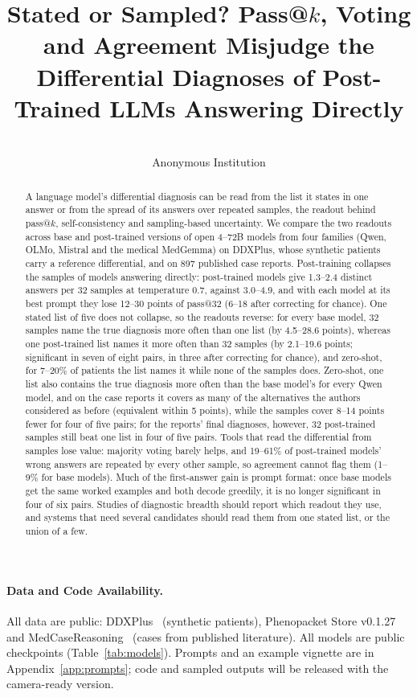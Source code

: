 \documentclass[wcp]{jmlr}
\title[Stated or Sampled?]{Stated or Sampled? Pass@$k$, Voting and Agreement Misjudge the Differential Diagnoses of Post-Trained LLMs Answering Directly}
\author{\Name{Anonymous Authors}\\ \addr Anonymous Institution}
\begin{document}
\maketitle

\begin{abstract}
A language model's differential diagnosis can be read from the list it states in one answer or from the spread of its answers over repeated samples, the readout behind pass@$k$, self-consistency and sampling-based uncertainty. We compare the two readouts across base and post-trained versions of open 4--72B models from four families (Qwen, OLMo, Mistral and the medical MedGemma) on DDXPlus, whose synthetic patients carry a reference differential, and on 897 published case reports.
Post-training collapses the samples of models answering directly: post-trained models give 1.3--2.4 distinct answers per 32 samples at temperature 0.7, against 3.0--4.9, and with each model at its best prompt they lose 12--30 points of pass@32 (6--18 after correcting for chance). One stated list of five does not collapse, so the readouts reverse: for every base model, 32 samples name the true diagnosis more often than one list (by 4.5--28.6 points), whereas one post-trained list names it more often than 32 samples (by 2.1--19.6 points; significant in seven of eight pairs, in three after correcting for chance), and zero-shot, for 7--20\% of patients the list names it while none of the samples does. Zero-shot, one list also contains the true diagnosis more often than the base model's for every Qwen model, and on the case reports it covers as many of the alternatives the authors considered as before (equivalent within 5 points), while the samples cover 8--14 points fewer for four of five pairs; for the reports' final diagnoses, however, 32 post-trained samples still beat one list in four of five pairs.
Tools that read the differential from samples lose value: majority voting barely helps, and 19--61\% of post-trained models' wrong answers are repeated by every other sample, so agreement cannot flag them (1--9\% for base models). Much of the first-answer gain is prompt format: once base models get the same worked examples and both decode greedily, it is no longer significant in four of six pairs. Studies of diagnostic breadth should report which readout they use, and systems that need several candidates should read them from one stated list, or the union of a few.
\end{abstract}

\paragraph{Data and Code Availability.}
All data are public: DDXPlus~\citep{fansi2022ddxplus} (synthetic patients), Phenopacket Store v0.1.27~\citep{danis2025phenopacketstore} and MedCaseReasoning~\citep{wu2025medcasereasoning} (cases from published literature). All models are public checkpoints (Table~\ref{tab:models}). Prompts and an example vignette are in Appendix~\ref{app:prompts}; code and sampled outputs will be released with the camera-ready version.
\end{document}
